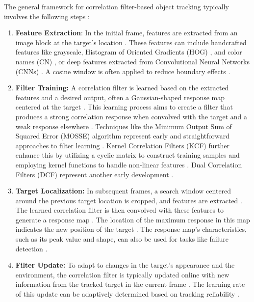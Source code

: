 The general framework for correlation filter-based object tracking typically involves the following steps \cite{du2021overview}\cite{zhao2020correlation}:
\begin{enumerate}
    \item \textbf{Feature Extraction}: In the initial frame, features are extracted from an image block at the target's location  \cite{du2021overview} \cite{zhao2020correlation}. These features can include handcrafted features like grayscale, Histogram of Oriented Gradients (HOG) \cite{zhao2020correlation}\cite{du2021overview}, and color names (CN) \cite{lin2024motion}, or deep features extracted from Convolutional Neural Networks (CNNs) \cite{du2021overview}\cite{zhao2020correlation}\cite{lin2024motion} . A cosine window is often applied to reduce boundary effects \cite{du2021overview}.

    \item \textbf{Filter Training:} A correlation filter is learned based on the extracted features and a desired output, often a Gaussian-shaped response map centered at the target \cite{feng2019dynamic}\cite{du2021overview} . This learning process aims to create a filter that produces a strong correlation response when convolved with the target and a weak response elsewhere \cite{qiu2024boundary}\cite{du2021overview}. Techniques like the Minimum Output Sum of Squared Error (MOSSE) algorithm represent early and straightforward approaches to filter learning \cite{feng2019dynamic} \cite{du2021overview} \cite{zhao2020correlation}. Kernel Correlation Filters (KCF) further enhance this by utilizing a cyclic matrix to construct training samples and employing kernel functions to handle non-linear features \cite{du2021overview}\cite{zhao2020correlation}\cite{lin2024motion}. Dual Correlation Filters (DCF) represent another early development \cite{du2021overview}.

    \item \textbf{Target Localization:} In subsequent frames, a search window centered around the previous target location is cropped, and features are extracted \cite{zhao2020correlation}. The learned correlation filter is then convolved with these features to generate a response map \cite{du2021overview}\cite{zhao2020correlation}. The location of the maximum response in this map indicates the new position of the target \cite{du2021overview}\cite{zhao2020correlation}. The response map's characteristics, such as its peak value and shape, can also be used for tasks like failure detection \cite{lin2024motion}.

    \item \textbf{Filter Update:} To adapt to changes in the target's appearance and the environment, the correlation filter is typically updated online with new information from the tracked target in the current frame \cite{qiu2024boundary}\cite{du2021overview}\cite{zhao2020correlation}. The learning rate of this update can be adaptively determined based on tracking reliability \cite{du2021overview}.
\end{enumerate}

